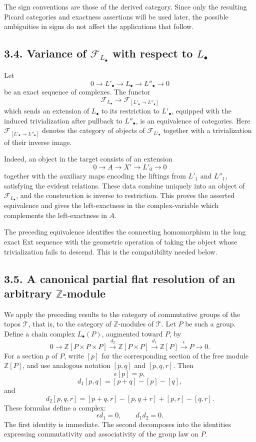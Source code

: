 \documentclass[11pt]{article}
\newcommand{\bZ}{\mathbb Z}
\newcommand{\cT}{\mathcal T}
\newcommand{\cF}{\mathcal F}
\begin{document}
The sign conventions are those of the derived category. Since only the resulting
Picard categories and exactness assertions will be used later, the possible
ambiguities in signs do not affect the applications that follow.

\subsection*{3.4. Variance of \(\cF_{L_\bullet}\) with respect to \(L_\bullet\)}

Let
\[
0\to L'_\bullet\to L_\bullet\to L''_\bullet\to 0
\]
be an exact sequence of complexes. The functor
\[
\cF_{L_\bullet}\longrightarrow \cF_{[L'_\bullet\to L''_\bullet]}
\]
which sends an extension of \(L_\bullet\) to its restriction to \(L'_\bullet\),
equipped with the induced trivialization after pullback to \(L''_\bullet\), is an
equivalence of categories. Here
\(\cF_{[L'_\bullet\to L''_\bullet]}\) denotes the category of objects of
\(\cF_{L'_\bullet}\) together with a trivialization of their inverse image.

Indeed, an object in the target consists of an extension
\[
0\to A\to X'\to L'_0\to 0
\]
together with the auxiliary maps encoding the liftings from \(L'_1\) and
\(L''_1\), satisfying the evident relations. These data combine uniquely into an
object of \(\cF_{L_\bullet}\), and the construction is inverse to restriction.
This proves the asserted equivalence and gives the left-exactness in the
complex-variable which complements the left-exactness in \(A\).

The preceding equivalence identifies the connecting homomorphism in the long
exact Ext sequence with the geometric operation of taking the object whose
trivialization fails to descend. This is the compatibility needed below.

\subsection*{3.5. A canonical partial flat resolution of an arbitrary \(\bZ\)-module}

We apply the preceding results to the category of commutative groups of the topos
\(\cT\), that is, to the category of \(\bZ\)-modules of \(\cT\). Let \(P\) be
such a group. Define a chain complex \(L_\bullet(P)\), augmented toward \(P\), by
\[
0\longrightarrow \bZ[P\times P\times P]
\xrightarrow{d_2}\bZ[P\times P]
\xrightarrow{d_1}\bZ[P]
\xrightarrow{\epsilon}P\longrightarrow 0.
\]
For a section \(p\) of \(P\), write \([p]\) for the corresponding section of the
free module \(\bZ[P]\), and use analogous notation \([p,q]\) and \([p,q,r]\).
Then
\[
\epsilon[p]=p,
\]
\[
d_1[p,q]=[p+q]-[p]-[q],
\]
and
\[
d_2[p,q,r]=[p+q,r]-[p,q+r]+[p,r]-[q,r].
\]
These formulas define a complex:
\[
\epsilon d_1=0,\qquad d_1d_2=0.
\]
The first identity is immediate. The second decomposes into the identities
expressing commutativity and associativity of the group law on \(P\).
\end{document}
